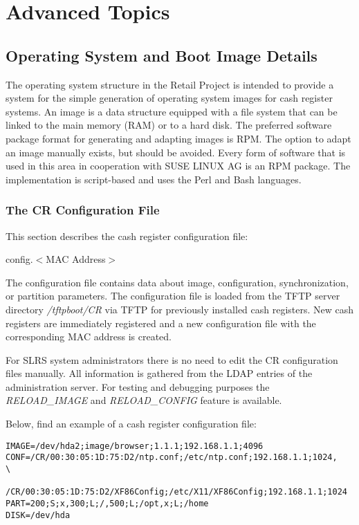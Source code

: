 \chapter{Advanced Topics}
\label{advtopic}
\minitoc
\section{Operating System and Boot Image Details}
The operating system structure in the Retail Project is intended to provide
a system for the simple generation of operating system images for cash register
systems. An image is a data structure equipped with a file system that can
be linked to the main memory (RAM) or to a hard disk. The preferred software
package format for generating and adapting images is RPM. The option
to adapt an image manually exists, but should be avoided. Every form of
software that is used in this area in cooperation with SUSE LINUX AG is an
RPM package. The implementation is script-based and uses the Perl and Bash
languages.


\subsection{The CR Configuration File}
\label{section:confmac}
This section describes the cash register configuration file:

\begin{Command}{8cm}
            config.$<$MAC Address$>$
\end{Command}

The configuration file contains data about
image, configuration, synchronization, or partition parameters.
The configuration file is loaded from the TFTP server directory \textit{/tftpboot/CR} via TFTP
for previously installed cash registers. New cash registers are immediately registered and a new
configuration file with the corresponding MAC address is created.

For SLRS system administrators there is no need to edit the CR configuration files manually.
All information is gathered from the LDAP entries of the administration server.
For testing and debugging purposes the \textit{RELOAD\_IMAGE} and \textit{RELOAD\_CONFIG} feature
is available.

Below, find an example of a cash register configuration file:
\begin{verbatim}
IMAGE=/dev/hda2;image/browser;1.1.1;192.168.1.1;4096
CONF=/CR/00:30:05:1D:75:D2/ntp.conf;/etc/ntp.conf;192.168.1.1;1024,     \
     /CR/00:30:05:1D:75:D2/XF86Config;/etc/X11/XF86Config;192.168.1.1;1024
PART=200;S;x,300;L;/,500;L;/opt,x;L;/home
DISK=/dev/hda
\end{verbatim}


